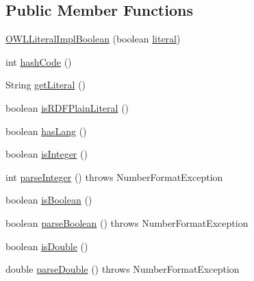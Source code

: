\subsection*{Public Member Functions}
\begin{DoxyCompactItemize}
\item 
\hyperlink{classuk_1_1ac_1_1manchester_1_1cs_1_1owl_1_1owlapi_1_1_o_w_l_literal_impl_boolean_ac35c2e7639185480f3ca53c8efcdbb57}{O\-W\-L\-Literal\-Impl\-Boolean} (boolean \hyperlink{classuk_1_1ac_1_1manchester_1_1cs_1_1owl_1_1owlapi_1_1_o_w_l_literal_impl_boolean_accf40804ce4aca981a4c1be331d02807}{literal})
\item 
int \hyperlink{classuk_1_1ac_1_1manchester_1_1cs_1_1owl_1_1owlapi_1_1_o_w_l_literal_impl_boolean_a87c03d7ee22091065a2149c233814a7c}{hash\-Code} ()
\item 
String \hyperlink{classuk_1_1ac_1_1manchester_1_1cs_1_1owl_1_1owlapi_1_1_o_w_l_literal_impl_boolean_a590346754447028b591537e24106f444}{get\-Literal} ()
\item 
boolean \hyperlink{classuk_1_1ac_1_1manchester_1_1cs_1_1owl_1_1owlapi_1_1_o_w_l_literal_impl_boolean_ae919cbe35413ee1003e36b384ea427c5}{is\-R\-D\-F\-Plain\-Literal} ()
\item 
boolean \hyperlink{classuk_1_1ac_1_1manchester_1_1cs_1_1owl_1_1owlapi_1_1_o_w_l_literal_impl_boolean_ae5bfba2e3888dafa16aa2834fc73ec12}{has\-Lang} ()
\item 
boolean \hyperlink{classuk_1_1ac_1_1manchester_1_1cs_1_1owl_1_1owlapi_1_1_o_w_l_literal_impl_boolean_a26fc3b865c2685bb263d7ffb8135e793}{is\-Integer} ()
\item 
int \hyperlink{classuk_1_1ac_1_1manchester_1_1cs_1_1owl_1_1owlapi_1_1_o_w_l_literal_impl_boolean_af783a6005225e447e1c5b0b13181201b}{parse\-Integer} ()  throws Number\-Format\-Exception 
\item 
boolean \hyperlink{classuk_1_1ac_1_1manchester_1_1cs_1_1owl_1_1owlapi_1_1_o_w_l_literal_impl_boolean_a80a096b52b6af11e2914f57925748bfb}{is\-Boolean} ()
\item 
boolean \hyperlink{classuk_1_1ac_1_1manchester_1_1cs_1_1owl_1_1owlapi_1_1_o_w_l_literal_impl_boolean_ab8a07721598045e476001b72f4dce98e}{parse\-Boolean} ()  throws Number\-Format\-Exception 
\item 
boolean \hyperlink{classuk_1_1ac_1_1manchester_1_1cs_1_1owl_1_1owlapi_1_1_o_w_l_literal_impl_boolean_a6e2b4bad54aa717d77a014beb7411bda}{is\-Double} ()
\item 
double \hyperlink{classuk_1_1ac_1_1manchester_1_1cs_1_1owl_1_1owlapi_1_1_o_w_l_literal_impl_boolean_ae8a18a2aa2e2cc0de4d96df607f3ff17}{parse\-Double} ()  throws Number\-Format\-Exception 

\end{DoxyCompactItemize}
